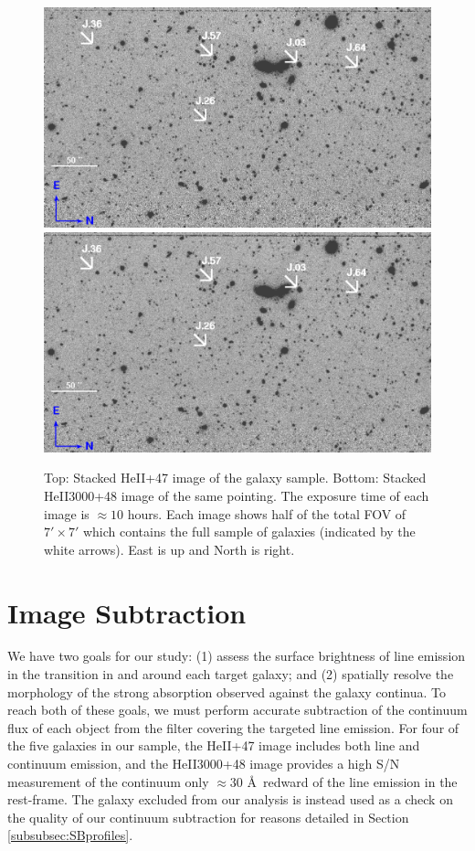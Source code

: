 \documentclass[twocolumn]{aastex61}
\begin{document}
\begin{figure}[ht!]
\centering
\includegraphics[scale=.61]{../Figures/HEII_final.png}
\includegraphics[scale=.61]{../Figures/HEII3000_final.png}
\caption{Top: Stacked HeII+47 image of the galaxy sample. Bottom: Stacked HeII3000+48 image of the same pointing. The exposure time of each image is $\approx 10$ hours. Each image shows half of the total FOV of $7' \times 7'$ which contains the full sample of galaxies (indicated by the white arrows). East is up and North is right.
\label{fig:stacked_image}}
\end{figure}

\section{Image Subtraction}\label{sec.cont_sub}
We have two goals for our study: (1) assess the surface brightness of line emission in the  transition in and around each target galaxy; and (2) spatially resolve the morphology of the strong  absorption observed against the galaxy continua.
To reach both of these goals, we must perform accurate subtraction of the continuum flux of each object from the filter covering the targeted line emission. For four of the five galaxies in our sample, the HeII+47 image includes both line and continuum emission, and the HeII3000+48 image provides a high S/N measurement of the continuum only $\approx30$ \AA\ redward of the line emission in the rest-frame. The galaxy excluded from our analysis is instead used as a check on the quality of our continuum subtraction for reasons detailed in Section \ref{subsubsec:SBprofiles}.
\end{document}

